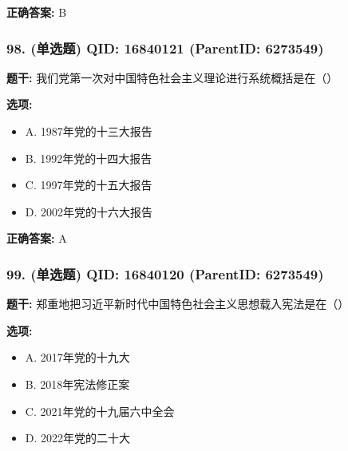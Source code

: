 \documentclass[12pt,UTF8]{ctexart}
\begin{document}
\textbf{正确答案:}
B

\vspace{0.3em}\hrulefill\vspace{0.7em}

\subsubsection*{98. (单选题) \small QID: 16840121 (ParentID: 6273549)}

\textbf{题干:}
我们党第一次对中国特色社会主义理论进行系统概括是在（）



\textbf{选项:}
\begin{itemize}[leftmargin=*]

  \item A. 1987年党的十三大报告

  \item B. 1992年党的十四大报告

  \item C. 1997年党的十五大报告

  \item D. 2002年党的十六大报告

\end{itemize}

\textbf{正确答案:}
A

\vspace{0.3em}\hrulefill\vspace{0.7em}

\subsubsection*{99. (单选题) \small QID: 16840120 (ParentID: 6273549)}

\textbf{题干:}
郑重地把习近平新时代中国特色社会主义思想载入宪法是在（）



\textbf{选项:}
\begin{itemize}[leftmargin=*]

  \item A. 2017年党的十九大

  \item B. 2018年宪法修正案

  \item C. 2021年党的十九届六中全会

  \item D. 2022年党的二十大

\end{itemize}
\end{document}
